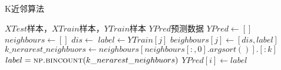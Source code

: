 \documentclass[11pt]{article}
\begin{document}
\begin{CJK*}{UTF8}{gkai}
    \begin{algorithm}
        \caption{K近邻算法}
        \begin{algorithmic}[1] %
            \Require $XTest$样本，$XTrain$样本，$YTrain$样本
            \Ensure $YPred$预测数据
                \State $YPred \gets []$ 
                	\State $neighbours \gets []$
						\State $dis \gets $ 
						\State $label \gets YTrain[j]$
						\State $beighbours[j] \gets [dis,label]$
					\EndFor
					\State $k\_nerarest\_neighbuors \gets neighbours[neighbours[:,0].argsort()].[:k]$
					\State $label = \Call{np.bincount}{k\_nerarest\_neighbuors}$
					\State $YPred[i] \gets label$
                \EndFor
                
                \State {}
            \EndFunction
        \end{algorithmic}
    \end{algorithm}
\end{CJK*}
\end{document}
